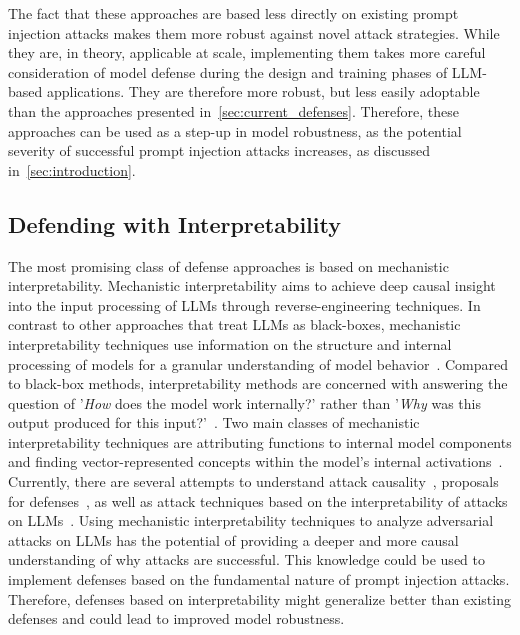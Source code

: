 The fact that these approaches are based less directly on existing prompt injection attacks makes them more robust against novel attack strategies.
While they are, in theory, applicable at scale, implementing them takes more careful consideration of model defense during the design and training phases of LLM-based applications.
They are therefore more robust, but less easily adoptable than the approaches presented in~\cref{sec:current_defenses}.
Therefore, these approaches can be used as a step-up in model robustness, as the potential severity of successful prompt injection attacks increases, as discussed in~\cref{sec:introduction}.

\subsection{Defending with Interpretability}
The most promising class of defense approaches is based on mechanistic interpretability.
Mechanistic interpretability aims to achieve deep causal insight into the input processing of LLMs through reverse-engineering techniques.
In contrast to other approaches that treat LLMs as black-boxes, mechanistic interpretability techniques use information on the structure and internal processing of models for a granular understanding of model behavior~\cite{saphra_mechanistic_2024, rai_practical_2024}.
Compared to black-box methods, interpretability methods are concerned with answering the question of '\emph{How} does the model work internally?' rather than '\emph{Why} was this output produced for this input?'~\cite{russell_artificial_2021}.
Two main classes of mechanistic interpretability techniques are attributing functions to internal model components and finding vector-represented concepts within the model's internal activations~\cite{rai_practical_2024}.\\

Currently, there are several attempts to understand attack causality~\cite{kirch_what_2025, lin_towards_2024, garcia-carrasco_detecting_2024}, proposals for defenses~\cite{bereska_mechanistic_2024}, as well as attack techniques based on the interpretability of attacks on LLMs~\cite{winninger_using_2025}.
Using mechanistic interpretability techniques to analyze adversarial attacks on LLMs has the potential of providing a deeper and more causal understanding of why attacks are successful.
This knowledge could be used to implement defenses based on the fundamental nature of prompt injection attacks.
Therefore, defenses based on interpretability might generalize better than existing defenses and could lead to improved model robustness.\\

